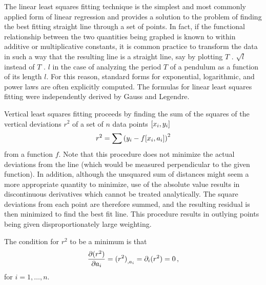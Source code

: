 The linear least squares fitting technique is the simplest and most commonly applied form of linear regression and provides a solution to the problem of finding the best fitting straight line through a set of points. In fact, if the functional relationship between the two quantities being graphed is known to within additive or multiplicative constants, it is common practice to transform the data in such a way that the resulting line is a straight line, say by plotting $T$ \vs. $\sqrt{l}$ instead of $T$ \vs. $l$ in the case of analyzing the period $T$ of a pendulum as a function of its length $l$. For this reason, standard forms for exponential, logarithmic, and power laws are often explicitly computed. The formulas for linear least squares fitting were independently derived by Gauss and Legendre.

Vertical least squares fitting proceeds by finding the sum of the squares of the vertical deviations $r^2$ of a set of $n$ data points $\left[{x_i, y_i}\right]$
\begin{equation}\label{eq:squaresverticaldeviations}
r^2 = \sum\left(y_i - f\!\left[{x_i, a_i}\right]\right)^2
\end{equation}
from a function $f$. Note that this procedure does not minimize the actual deviations from the line (which would be measured perpendicular to the given function). In addition, although the unsquared sum of distances might seem a more appropriate quantity to minimize, use of the absolute value results in discontinuous derivatives which cannot be treated analytically. The square deviations from each point are therefore summed, and the resulting residual is then minimized to find the best fit line. This procedure results in outlying points being given disproportionately large weighting.

The condition for $r^2$ to be a minimum is that
\begin{equation}\label{eq:conditiontobemin}
\dfrac{\partial{(r^2)}}{\partial{a_i}} = {(r^2)}_{,{a_i}} = \partial_{i}{(r^2)} = 0\,,
\end{equation}
for $i = 1,\dotsc,n$.



